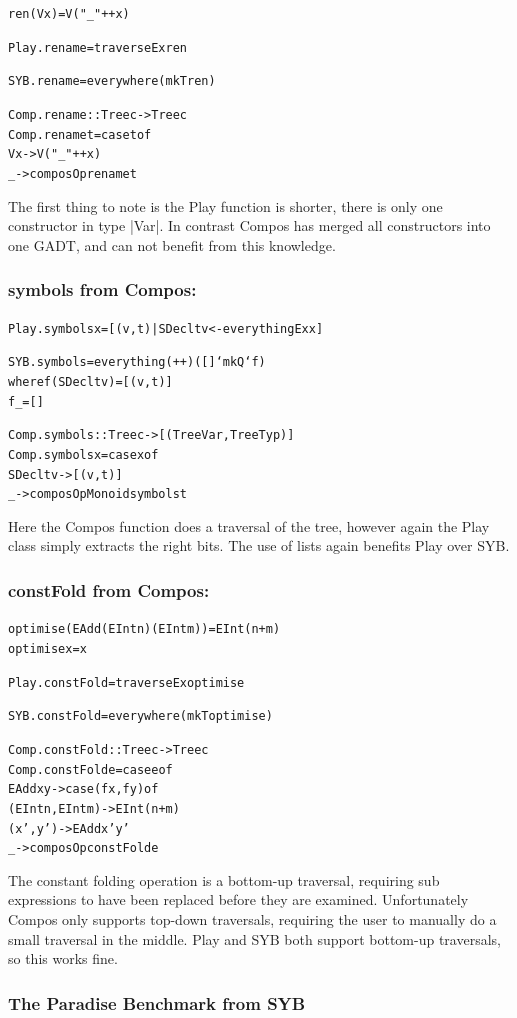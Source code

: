 \documentclass[preprint]{sigplanconf}
\newenvironment{code}{\begin{alltt}\small}{\end{alltt}}
\newcommand{\compare}[2]{\subsubsection*{\textsf{#1} from #2:}\vspace{-1ex}}
\begin{document}
\begin{code}
ren (V x) = V ("_" ++ x)

Play.rename = traverseEx ren

SYB.rename = everywhere (mkT ren)

Comp.rename :: Tree c -> Tree c
Comp.rename t = case t of
    V x -> V ("_" ++ x)
    _   -> composOp rename t
\end{code}

The first thing to note is the Play function is shorter, there is only one constructor in type |Var|. In contrast Compos has merged all constructors into one GADT, and can not benefit from this knowledge.


\compare{symbols}{Compos}

\begin{code}
Play.symbols x = [(v,t) | SDecl t v <- everythingEx x]

SYB.symbols = everything (++) ([] `mkQ` f)
    where  f (SDecl t v)  = [(v,t)]
           f _            = []

Comp.symbols :: Tree c -> [(Tree Var, Tree Typ)]
Comp.symbols x = case x of
    SDecl t v -> [(v,t)]
    _ -> composOpMonoid symbols t
\end{code}

Here the Compos function does a traversal of the tree, however again the Play class simply extracts the right bits. The use of lists again benefits Play over SYB.

\compare{constFold}{Compos}

\begin{code}
optimise (EAdd (EInt n) (EInt m)) = EInt (n+m)
optimise x = x

Play.constFold = traverseEx optimise

SYB.constFold = everywhere (mkT optimise)

Comp.constFold :: Tree c -> Tree c
Comp.constFold e = case e of
    EAdd x y -> case  (f x, f y) of
                      (EInt n, EInt m) -> EInt (n+m)
                      (x',y') -> EAdd x' y'
    _ -> composOp constFold e
\end{code}

The constant folding operation is a bottom-up traversal, requiring sub expressions to have been replaced before they are examined. Unfortunately Compos only supports top-down traversals, requiring the user to manually do a small traversal in the middle. Play and SYB both support bottom-up traversals, so this works fine.

\subsubsection{The Paradise Benchmark from SYB}
\end{document}
